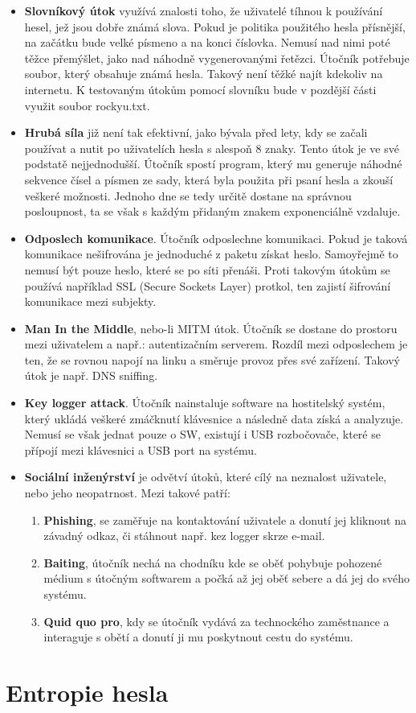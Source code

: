 \begin{itemize}
	\item \textbf{Slovníkový útok} využívá znalosti toho, že uživatelé tíhnou k používání hesel, jež jsou dobře známá slova. Pokud je politika použitého hesla přísnější, na začátku bude velké písmeno a na konci číslovka. Nemusí nad nimi poté těžce přemýšlet, jako nad náhodně vygenerovanými řetězci. Útočník potřebuje soubor, který obsahuje známá hesla. Takový není těžké najít kdekoliv na internetu. K testovaným útokům pomocí slovníku bude v pozdější části využit soubor rockyu.txt. 
	\item \textbf{Hrubá síla} již není tak efektivní, jako bývala před lety, kdy se začali používat a nutit po uživatelích hesla s alespoň 8 znaky. Tento útok je ve své podstatě nejjednodušší. Útočník spostí program, který mu generuje náhodné sekvence čísel a písmen ze sady, která byla použita při psaní hesla a zkouší veškeré možnosti. Jednoho dne se tedy určitě dostane na správnou posloupnost, ta se však s každým přidaným znakem exponenciálně vzdaluje.
	\item \textbf{Odposlech komunikace}. Útočník odposlechne komunikaci. Pokud je taková komunikace nešifrována je jednoduché z paketu získat heslo. Samoyřejmě to nemusí být pouze heslo, které se po síti přenáši. Proti takovým útokům se používá například SSL (Secure Sockets Layer) protkol, ten zajistí šifrování komunikace mezi subjekty.
	\item \textbf{Man In the Middle}, nebo-li MITM útok. Útočník se dostane do prostoru mezi uživatelem a např.: autentizačním serverem. Rozdíl mezi odposlechem je ten, že se rovnou napojí na linku a směruje provoz přes své zařízení. Takový útok je např. DNS sniffing.
	\item \textbf{Key logger attack}. Útočník nainstaluje software na hostitelský systém, který ukládá veškeré zmáčknutí klávesnice a následně data získá a analyzuje. Nemusí se však jednat pouze o SW, existují i USB rozbočovače, které se přípojí mezi klávesnici a USB port na systému.
	\item \textbf{Sociální inženýrství} je odvětví útoků, které cílý na neznalost uživatele, nebo jeho neopatrnost. Mezi takové patří: 
	\begin{enumerate}
		\item \textbf{Phishing}, se zaměřuje na kontaktování uživatele a donutí jej kliknout na závadný odkaz, či stáhnout např. kez logger skrze e-mail.
		\item \textbf{Baiting}, útočník nechá na chodníku kde se oběť pohybuje pohozené médium s útočným softwarem a počká až jej oběť sebere a dá jej do svého systému.
		\item \textbf{Quid quo pro}, kdy se útočník vydává za technockého zaměstnance a interaguje s obětí a donutí ji mu poskytnout cestu do systému.
	\end{enumerate}
\end{itemize}


\section{Entropie hesla}




